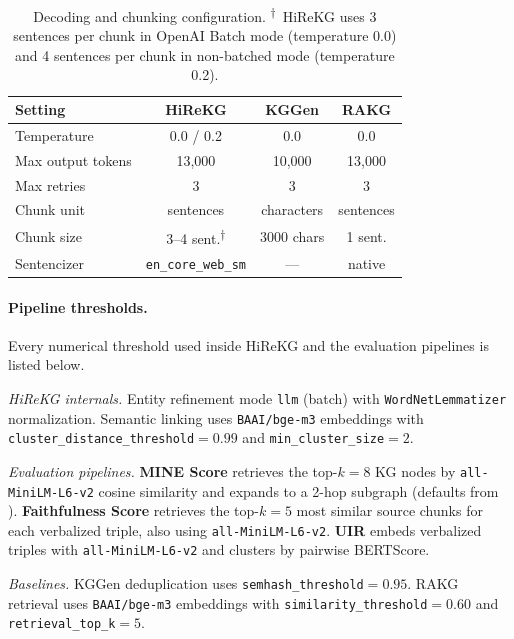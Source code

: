 \documentclass[11pt]{article}
\begin{document}
\begin{table}[t!]
\centering
\small
\setlength{\tabcolsep}{2.5pt}
\begin{tabular}{lccc}
\toprule
\textbf{Setting} & \textbf{HiReKG} & \textbf{KGGen} & \textbf{RAKG} \\
\midrule
Temperature       & 0.0 / 0.2 & 0.0 & 0.0 \\
Max output tokens & 13{,}000  & 10{,}000 & 13{,}000 \\
Max retries       & 3         & 3        & 3 \\
\midrule
Chunk unit        & sentences & characters & sentences \\
Chunk size        & 3--4 sent.\textsuperscript{$\dagger$} & 3000 chars & 1 sent. \\
Sentencizer       & \texttt{en\_core\_web\_sm} & --- & native \\
\bottomrule
\end{tabular}
\caption{Decoding and chunking configuration. \textsuperscript{$\dagger$}~HiReKG uses 3 sentences per chunk in OpenAI Batch mode (temperature 0.0) and 4 sentences per chunk in non-batched mode (temperature 0.2).}
\label{tab:hparams}
\end{table}

\paragraph{Pipeline thresholds.} Every numerical threshold used inside HiReKG and the evaluation pipelines is listed below.

\smallskip
\noindent\textit{HiReKG internals.} Entity refinement mode \texttt{llm} (batch) with \texttt{WordNetLemmatizer} normalization. Semantic linking uses \texttt{BAAI/bge-m3} embeddings with \texttt{cluster\_distance\_threshold}$=0.99$ and \texttt{min\_cluster\_size}$=2$.

\smallskip
\noindent\textit{Evaluation pipelines.} \textbf{MINE Score} retrieves the top-$k{=}8$ KG nodes by \texttt{all-MiniLM-L6-v2} cosine similarity and expands to a 2-hop subgraph (defaults from \citealp{kggen}). \textbf{Faithfulness Score} retrieves the top-$k{=}5$ most similar source chunks for each verbalized triple, also using \texttt{all-MiniLM-L6-v2}. \textbf{UIR} embeds verbalized triples with \texttt{all-MiniLM-L6-v2} and clusters by pairwise BERTScore.

\smallskip
\noindent\textit{Baselines.} KGGen deduplication uses \texttt{semhash\_threshold}$=0.95$. RAKG retrieval uses \texttt{BAAI/bge-m3} embeddings with \texttt{similarity\_threshold}$=0.60$ and \texttt{retrieval\_top\_k}$=5$.
\end{document}
